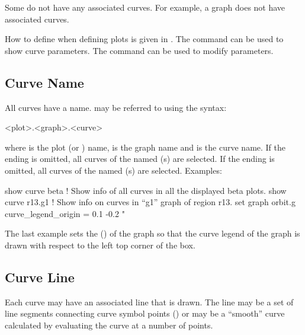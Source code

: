 {{{{{{{Some  do not have any associated curves. For example, a  graph does not
have associated curves.

How to define  when defining  plots is given in . The
 command can be used to show curve parameters. The  command can
be used to modify  parameters.

\subsection{Curve Name}
\label{s:curve.name}

All curves have a name.  may be referred to using the syntax:
\begin{example}
  <plot>.<graph>.<curve>
\end{example}
where  is the plot (or ) name,  is the graph name and 
is the curve name. If the  ending is omitted, all curves of the named (s) are
selected. If the  ending is omitted, all curves of the named (s) are
selected. Examples:
\begin{example}
  show curve beta   ! Show info of all curves in all the displayed beta plots.
  show curve r13.g1 ! Show info on curves in ``g1'' graph of region r13.
  set graph orbit.g curve_legend_origin = 0.1 -0.2 "%
\end{example}
The last example sets the  () of the graph so that the curve
legend of the graph is drawn with respect to the left top corner of the box.

\subsection{Curve Line}
\label{s:curve.line}

Each curve may have an associated line that is drawn. The line may be a set of line segments
connecting curve symbol points () or may be a ``smooth'' curve calculated by
evaluating the curve at a number of points. 

}}}}}}}
